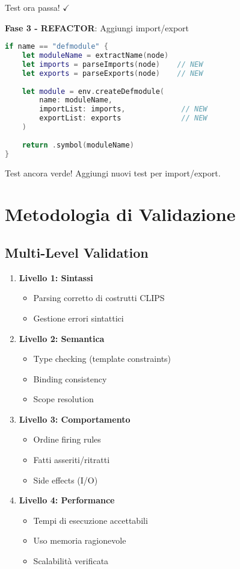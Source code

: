 Test ora passa! $\checkmark$

\textbf{Fase 3 - REFACTOR}: Aggiungi import/export

\begin{lstlisting}[language=Swift]
if name == "defmodule" {
    let moduleName = extractName(node)
    let imports = parseImports(node)    // NEW
    let exports = parseExports(node)    // NEW
    
    let module = env.createDefmodule(
        name: moduleName,
        importList: imports,             // NEW
        exportList: exports              // NEW
    )
    
    return .symbol(moduleName)
}
\end{lstlisting}

Test ancora verde! Aggiungi nuovi test per import/export.

\section{Metodologia di Validazione}

\subsection{Multi-Level Validation}

\begin{enumerate}
\item \textbf{Livello 1: Sintassi}
   \begin{itemize}
   \item Parsing corretto di costrutti CLIPS
   \item Gestione errori sintattici
   \end{itemize}

\item \textbf{Livello 2: Semantica}
   \begin{itemize}
   \item Type checking (template constraints)
   \item Binding consistency
   \item Scope resolution
   \end{itemize}

\item \textbf{Livello 3: Comportamento}
   \begin{itemize}
   \item Ordine firing rules
   \item Fatti asseriti/ritratti
   \item Side effects (I/O)
   \end{itemize}

\item \textbf{Livello 4: Performance}
   \begin{itemize}
   \item Tempi di esecuzione accettabili
   \item Uso memoria ragionevole
   \item Scalabilità verificata
   \end{itemize}
\end{enumerate}

